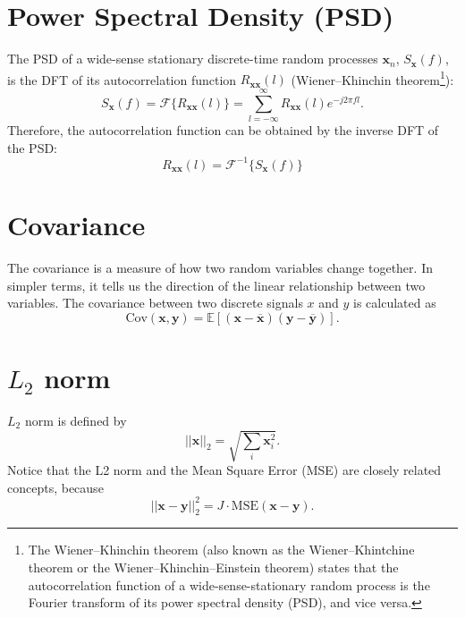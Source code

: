 \documentclass{article}
\begin{document}

\section{Power Spectral Density (PSD)}

The PSD of a wide-sense stationary discrete-time random processes
$\mathbf{x}_n$, $S_{\mathbf{x}}(f)$, is the DFT of its autocorrelation
function $R_{\mathbf{xx}}(l)$ (Wiener–Khinchin theorem\footnote{The
  Wiener–Khinchin theorem (also known as the Wiener–Khintchine theorem
  or the Wiener–Khinchin–Einstein theorem) states that the
  autocorrelation function of a wide-sense-stationary random
  process is the Fourier transform of its power spectral density
  (PSD), and vice versa.}):
\begin{equation}
  S_{\mathbf{x}}(f)=\mathcal{F}\{R_{\mathbf{xx}}(l)\}=\sum_{l=-\infty}^{\infty}R_{\mathbf{xx}}(l)e^{-j2\pi fl}.
\end{equation}
Therefore, the autocorrelation function can be obtained by the inverse DFT of the PSD:  
\begin{equation}
R_{\mathbf{xx}}(l)=\mathcal{F}^{-1}\{S_{\mathbf{x}}(f)\}
\end{equation}


\section{Covariance}
\label{sec:covariance}


The covariance is a measure of how two random variables change
together. In simpler terms, it tells us the direction of the linear
relationship between two variables. The covariance between two
discrete signals $x$ and $y$ is calculated as
\begin{equation}
  \text{Cov}(\textbf{x}, \textbf{y}) = \mathbb{E}[(\mathbf{x}-\overline{\mathbf{x}})(\mathbf{y}-\overline{\mathbf{y}})].
\end{equation}


\section{$L_2$ norm}
\label{sec:L2_norm}


$L_2$ norm is defined by
\begin{equation}
  ||\mathbf{x}||_2 = \sqrt{\sum_i\mathbf{x}_i^2}.
\end{equation}
Notice that the L2 norm and the Mean Square Error (MSE) are closely
related concepts, because
\begin{equation}
  ||\mathbf{x} - \mathbf{y}||_2^2 = J\cdot\text{MSE}(\mathbf{x} - \mathbf{y}).
\end{equation}





\end{document}
